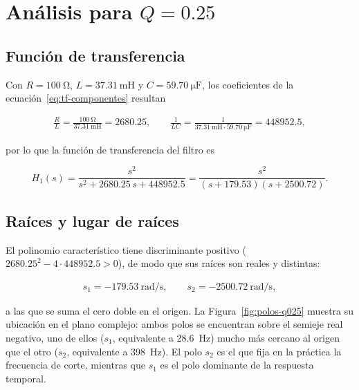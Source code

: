 \section{Análisis para $Q = \num{0.25}$}

\subsection{Función de transferencia}

Con $R = \qty{100}{\ohm}$, $L = \qty{37.31}{\milli\henry}$ y $C = \qty{59.70}{\micro\farad}$, los
coeficientes de la ecuación~\eqref{eq:tf-componentes} resultan

\begin{gather*}
  \frac{R}{L} = \frac{\qty{100}{\ohm}}{\qty{37.31}{\milli\henry}} = \num{2680.25}, \qquad
  \frac{1}{LC} = \frac{1}{\qty{37.31}{\milli\henry} \cdot \qty{59.70}{\micro\farad}} = \num{448952.5},
\end{gather*}

por lo que la función de transferencia del filtro es

\begin{equation}
  H_1(s) = \frac{s^2}{s^2 + \num{2680.25}\, s + \num{448952.5}}
         = \frac{s^2}{\left(s + \num{179.53}\right)\left(s + \num{2500.72}\right)}.
  \label{eq:tf-q025}
\end{equation}

\subsection{Raíces y lugar de raíces}

El polinomio característico tiene discriminante positivo
($\num{2680.25}^2 - 4 \cdot \num{448952.5} > 0$), de modo que sus raíces son reales y distintas:

\begin{gather*}
  s_1 = \num{-179.53}\ \unit{\radian\per\second}, \qquad
  s_2 = \num{-2500.72}\ \unit{\radian\per\second},
\end{gather*}

a las que se suma el cero doble en el origen. La Figura~\ref{fig:polos-q025} muestra su ubicación en el
plano complejo: ambos polos se encuentran sobre el semieje real negativo, uno de ellos
($s_1$, equivalente a \qty{28.6}{\hertz}) mucho más cercano al origen que el otro
($s_2$, equivalente a \qty{398}{\hertz}). El polo $s_2$ es el que fija en la práctica la frecuencia de corte,
mientras que $s_1$ es el polo dominante de la respuesta temporal.

